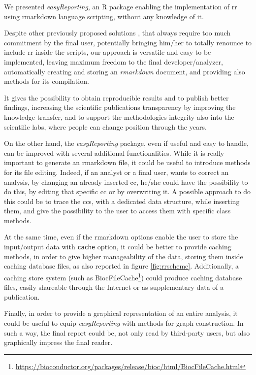We presented \textit{easyReporting}, an R package enabling the implementation of \gls{rr} using rmarkdown language scripting, without any knowledge of it.

Despite other  previously proposed solutions \cite{Napolitano2013, Napolitano2017}, that always require too much commitment by the final user, potentially bringing him/her to totally renounce to include \gls{rr} inside the scripts, our approach is versatile and easy to be implemented, leaving maximum freedom to the final developer/analyzer, automatically creating and storing an \textit{rmarkdown} document, and providing also methods for its compilation.

It gives the possibility to obtain reproducible results and to publish better findings, increasing the scientific publications transparency by improving the knowledge transfer, and to support the methodologies integrity also into the scientific labs, where people can change position through the years.

On the other hand, the \textit{easyReporting} package, even if useful and easy to handle, can be improved with several additional functionalities.
While it is really important to generate an rmarkdown file, it could be useful to introduce methods for its file editing. 
Indeed, if an analyst or a final user, wants to correct an analysis, by changing an already inserted \gls{cc}, he/she could have the possibility to do this, by editing that specific \gls{cc} or by overwriting it.
A possible approach to do this could be to trace the \glspl{cc}, with a dedicated data structure, while inserting them, and give the possibility to the user to access them with specific class methods.

At the same time, even if the rmarkdown options enable the user to store the input/output data with \lstinline!cache! option, it could be better to provide caching methods, in order to give higher manageability of the data, storing them inside caching database files, as also reported in figure \ref{fig:rrscheme}.
Additionally, a caching store system (such as BiocFileCache\footnote{\url{https://bioconductor.org/packages/release/bioc/html/BiocFileCache.html}}) could produce caching database files, easily shareable through the Internet or as supplementary data of a publication.

Finally, in order to provide a graphical representation of an entire analysis, it could be useful to equip \textit{easyReporting} with methods for graph construction.
In such a way, the final report could be, not only read by third-party users, but also graphically impress the final reader.



